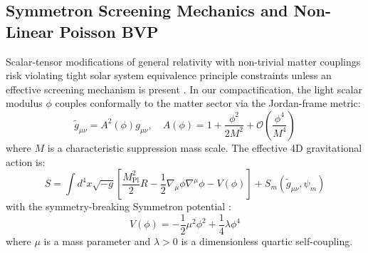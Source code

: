 \documentclass[11pt,a4paper]{article}
\begin{document}
\subsection{Symmetron Screening Mechanics and Non-Linear Poisson BVP}
Scalar-tensor modifications of general relativity with non-trivial matter couplings risk violating tight solar system equivalence principle constraints unless an effective screening mechanism is present \cite{brax2021}. In our compactification, the light scalar modulus $\phi$ couples conformally to the matter sector via the Jordan-frame metric:
\begin{equation}
\widetilde{g}_{\mu\nu} = A^2(\phi) g_{\mu\nu}, \quad A(\phi) = 1 + \frac{\phi^2}{2 M^2} + \mathcal{O}\left(\frac{\phi^4}{M^4}\right)
\end{equation}
where $M$ is a characteristic suppression mass scale. The effective 4D gravitational action is:
\begin{equation}
S = \int d^4x \sqrt{-g}\left[ \frac{M_{\text{Pl}}^2}{2} R - \frac{1}{2}\nabla_\mu \phi \nabla^\mu \phi - V(\phi) \right] + S_m(\widetilde{g}_{\mu\nu}, \psi_m)
\end{equation}
with the symmetry-breaking Symmetron potential \cite{hinterbichler2010}:
\begin{equation}
V(\phi) = -\frac{1}{2}\mu^2 \phi^2 + \frac{1}{4}\lambda \phi^4
\end{equation}
where $\mu$ is a mass parameter and $\lambda > 0$ is a dimensionless quartic self-coupling.
\end{document}
